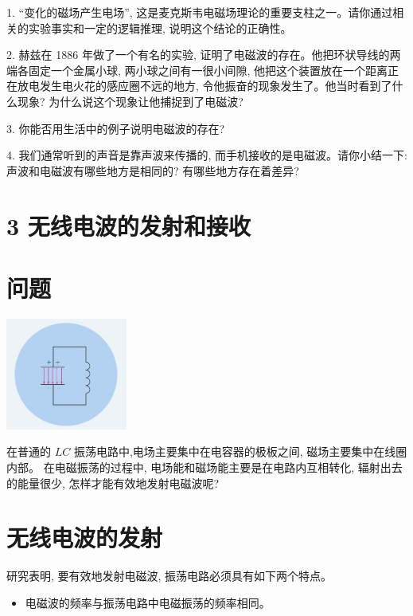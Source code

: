 \documentclass[10pt]{article}
\begin{document}
1. “变化的磁场产生电场”, 这是麦克斯韦电磁场理论的重要支柱之一。请你通过相关的实验事实和一定的逻辑推理, 说明这个结论的正确性。

2. 赫兹在 1886 年做了一个有名的实验, 证明了电磁波的存在。他把环状导线的两端各固定一个金属小球, 两小球之间有一很小间隙, 他把这个装置放在一个距离正在放电发生电火花的感应圈不远的地方, 令他振奋的现象发生了。他当时看到了什么现象? 为什么说这个现象让他捕捉到了电磁波?

3. 你能否用生活中的例子说明电磁波的存在?

4. 我们通常听到的声音是靠声波来传播的, 而手机接收的是电磁波。请你小结一下: 声波和电磁波有哪些地方是相同的? 有哪些地方存在着差异?

\section*{3 无线电波的发射和接收}

\section*{问题}

\begin{center}
\includegraphics[max width=0.3\textwidth]{images/01910e72-c5b7-7ed5-a6d4-fb3a5faefc32_85_852085.jpg}
\end{center}

在普通的 \({LC}\) 振荡电路中,电场主要集中在电容器的极板之间, 磁场主要集中在线圈内部。 在电磁振荡的过程中, 电场能和磁场能主要是在电路内互相转化, 辐射出去的能量很少, 怎样才能有效地发射电磁波呢?

\section*{无线电波的发射}

研究表明, 要有效地发射电磁波, 振荡电路必须具有如下两个特点。

\begin{mdframed}

\begin{itemize}
\item 电磁波的频率与振荡电路中电磁振荡的频率相同。
\end{itemize}

\end{mdframed}
\end{document}
